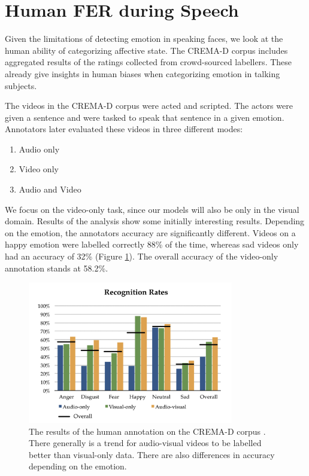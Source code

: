 
\section{Human FER during Speech}
\label{sec:human}
Given the limitations of detecting emotion in speaking faces, we look at the human ability of categorizing affective state. The CREMA-D corpus \cite{cao2014crema} includes aggregated results of the ratings collected from crowd-sourced labellers. These already give insights in human biases when categorizing emotion in talking subjects.

The videos in the CREMA-D corpus were acted and scripted. The actors were given a sentence and were tasked to speak that sentence in a given emotion. Annotators later evaluated these videos in three different modes:

\begin{enumerate}
    \item Audio only
    \item Video only
    \item Audio and Video
\end{enumerate}

We focus on the video-only task, since our models will also be only in the visual domain. Results of the analysis show some initially interesting results. Depending on the emotion, the annotators accuracy are significantly different. Videos on a happy emotion were labelled correctly 88\% of the time, whereas sad videos only had an accuracy of 32\% (Figure \ref{fig:crema_results}). The overall accuracy of the video-only annotation stands at 58.2\%.

\begin{figure}
    \centering
    \includegraphics[width=0.8\textwidth]{res/crema.png}
    \caption{The results of the human annotation on the CREMA-D corpus \cite{cao2014crema}. There generally is a trend for audio-visual videos to be labelled better than visual-only data. There are also differences in accuracy depending on the emotion.}
    \label{fig:crema_results}
\end{figure}

